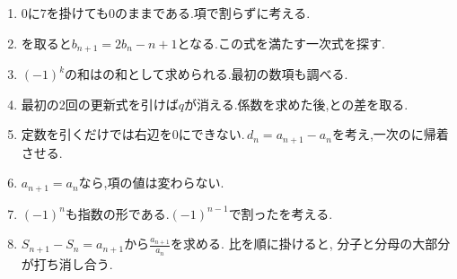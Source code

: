 \begin{enumerate}[label=\textbf{問\arabic*.},leftmargin=3.8em,format=\bookitemlink{practice-basic}{hint}{problem}]
          \item $0$に$7$を掛けても$0$のままである.項で割らずに考える.
          \item {}を取ると$b_{n+1}=2b_n-n+1$となる.この式を満たす一次式を探す.
          \item $(-1)^k$の和はの和として求められる.最初の数項も調べる.
          \item 最初の2回の更新式を引けば$q$が消える.係数を求めた後,との差を取る.
          \item 定数を引くだけでは右辺を$0$にできない.\,$d_n=a_{n+1}-a_n$を考え,一次のに帰着させる.
          \item $a_{n+1}=a_n$なら,項の値は変わらない.
          \item $(-1)^n$も指数の形である.$(-1)^{n-1}$で割ったを考える.
          \item $S_{n+1}-S_n=a_{n+1}$から$\displaystyle \frac{a_{n+1}}{a_n}$を求める. 比を順に掛けると, 分子と分母の大部分が打ち消し合う.
        \end{enumerate}

